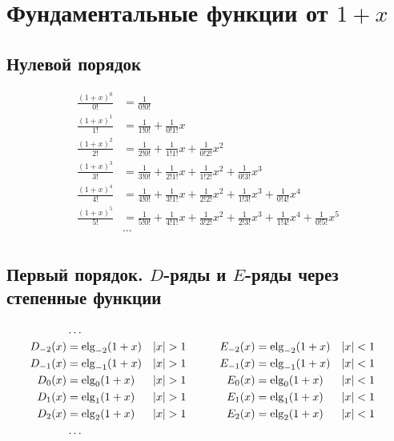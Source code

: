 
\section{Фундаментальные функции от $ 1 + x $}

\subsection{Нулевой порядок}

\begin{equation*}
\begin{aligned}
\frac{(1 + x)^0}{0!} &=
  \frac{1}{0!0!} 
\\
\frac{(1 + x)^1}{1!} &=
  \frac{1}{1!0!} 
+ \frac{1}{0!1!} x
\\
\frac{(1 + x)^2}{2!} &= 
  \frac{1}{2!0!} 
+ \frac{1}{1!1!} x 
+ \frac{1}{0!2!} x^2
\\
\frac{(1 + x)^3}{3!} &=
  \frac{1}{3!0!} 
+ \frac{1}{2!1!} x 
+ \frac{1}{1!2!} x^2 
+ \frac{1}{0!3!} x^3
\\
\frac{(1 + x)^4}{4!} &=
  \frac{1}{4!0!} 
+ \frac{1}{3!1!} x 
+ \frac{1}{2!2!} x^2 
+ \frac{1}{1!3!} x^3 
+ \frac{1}{0!4!} x^4
\\
\frac{(1 + x)^5}{5!} &=
  \frac{1}{5!0!} 
+ \frac{1}{4!1!} x 
+ \frac{1}{3!2!} x^2 
+ \frac{1}{2!3!} x^3 
+ \frac{1}{1!4!} x^4
+ \frac{1}{0!5!} x^5
\\
&\ldots
\\
\end{aligned}
\end{equation*}

\subsection{Первый порядок. $D$-ряды и $E$-ряды через степенные функции}

\begin{equation*} \begin{aligned}
&\ldots \\
D_{-2}(x) &= \elg_{-2}(1 + x) &
&|x| > 1 &
&\quad &
E_{-2}(x) &= \elg_{-2}(1 + x) &
&|x| < 1 \\
%
D_{-1}(x) &= \elg_{-1}(1 + x) &
&|x| > 1 &
&\quad &
E_{-1}(x) &= \elg_{-1}(1 + x) &
&|x| < 1 \\
%
D_0(x) &= \elg_0(1 + x) &
&|x| > 1 &
&\quad &
E_0(x) &= \elg_0(1 + x) &
&|x| < 1 \\
%
D_1(x) &= \elg_1(1 + x) &
&|x| > 1 &
&\quad &
E_1(x) &= \elg_1(1 + x) &
&|x| < 1 \\
%
D_2(x) &= \elg_2(1 + x) &
&|x| > 1 &
&\quad &
E_2(x) &= \elg_2(1 + x) &
&|x| < 1 \\
%
&\ldots \\
\end{aligned} \end{equation*}

